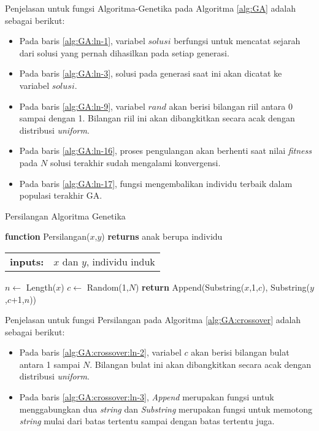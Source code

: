 Penjelasan untuk fungsi  Algoritma-Genetika pada Algoritma \ref{alg:GA} adalah sebagai berikut:
\begin{itemize}
	\item Pada baris \ref{alg:GA:ln-1}, variabel $solusi$ berfungsi untuk mencatat sejarah dari solusi yang pernah dihasilkan pada setiap generasi.
	\item Pada baris \ref{alg:GA:ln-3}, solusi pada generasi saat ini akan dicatat ke variabel $solusi$.
	\item Pada baris \ref{alg:GA:ln-9}, variabel $rand$ akan berisi bilangan riil antara 0 sampai dengan 1. Bilangan riil ini akan dibangkitkan secara acak dengan distribusi \textit{uniform}.
	\item Pada baris \ref{alg:GA:ln-16}, proses pengulangan akan berhenti saat nilai \textit{fitness} pada $N$ solusi terakhir sudah mengalami konvergensi.
	\item Pada baris \ref{alg:GA:ln-17}, fungsi mengembalikan individu terbaik dalam populasi terakhir GA.
\end{itemize}

\begin{algorithm}[H]
	\caption{Persilangan Algoritma Genetika}
	\label{alg:GA:crossover}
	\begin{flushleft}
		\textbf{function} Persilangan($x$,$y$) \textbf{returns} anak berupa individu
		\begin{flushleft}
			\begin{tabular}{ l l }
				\textbf{inputs:}& $x$ dan $y$, individu induk
				\hspace{5pt} 
			\end{tabular} 
		\end{flushleft}
	\end{flushleft}

	\begin{algorithmic}[1]
		\STATE $n \leftarrow$ Length($x$) \label{alg:GA:crossover:ln-1}
		\STATE $c \leftarrow$ Random(1,$N$) \label{alg:GA:crossover:ln-2}
		\STATE \textbf{return} Append(Substring($x$,1,$c$), Substring($y$,$c$+1,$n$)) \label{alg:GA:crossover:ln-3}
	\end{algorithmic}
\end{algorithm}

Penjelasan untuk fungsi Persilangan pada Algoritma \ref{alg:GA:crossover} adalah sebagai berikut:
\begin{itemize}
	\item Pada baris \ref{alg:GA:crossover:ln-2}, variabel $c$ akan berisi bilangan bulat antara 1 sampai $N$. Bilangan bulat ini akan dibangkitkan secara acak dengan distribusi \textit{uniform}.
	\item Pada baris \ref{alg:GA:crossover:ln-3}, \textit{Append} merupakan fungsi untuk menggabungkan dua \textit{string} dan \textit{Substring} merupakan fungsi untuk memotong \textit{string} mulai dari batas tertentu sampai dengan batas tertentu juga.
\end{itemize}

